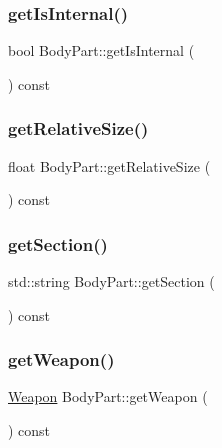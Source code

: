 \mbox{\label{class_body_part_a9a7b684a14febfb06d1c5abfdc99ed89}} 
\subsubsection{\texorpdfstring{get\+Is\+Internal()}{getIsInternal()}}
{\footnotesize\ttfamily bool Body\+Part\+::get\+Is\+Internal (\begin{DoxyParamCaption}{ }\end{DoxyParamCaption}) const}

\mbox{\label{class_body_part_a195def981a8f414a0456c9dfb2a70c0d}} 
\subsubsection{\texorpdfstring{get\+Relative\+Size()}{getRelativeSize()}}
{\footnotesize\ttfamily float Body\+Part\+::get\+Relative\+Size (\begin{DoxyParamCaption}{ }\end{DoxyParamCaption}) const}

\mbox{\label{class_body_part_a1603cca73c99ce6f2f2ca5c73e387594}} 
\subsubsection{\texorpdfstring{get\+Section()}{getSection()}}
{\footnotesize\ttfamily std\+::string Body\+Part\+::get\+Section (\begin{DoxyParamCaption}{ }\end{DoxyParamCaption}) const}

\mbox{\label{class_body_part_a36ed7476b0b1f17d8f54d87a0553126b}} 
\subsubsection{\texorpdfstring{get\+Weapon()}{getWeapon()}}
{\footnotesize\ttfamily \mbox{\hyperlink{class_weapon}{Weapon}} Body\+Part\+::get\+Weapon (\begin{DoxyParamCaption}{ }\end{DoxyParamCaption}) const}

